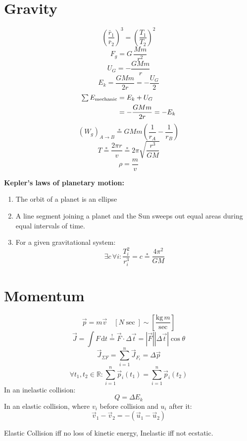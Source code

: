 \documentclass[]{article}
\newcommand\R     {\mathbb{R}}
\newcommand\seq   {\overset{!}{=}}
\newcommand\peq   {\overset{*}{=}}
\newcommand\dt    {\,\mathrm{d}t}
\newcommand\Dg        {\Delta}
\newcommand\co        {\colon}
\newcommand\sof[1]    {\left | #1 \right |}
\newcommand\cl [1]    {\left ( #1 \right )}
\newcommand\csb[1]    {\left [ #1 \right ]}
\begin{document}
\begin{multicols}{3}
		\section{Gravity}
		\[ \cl{\frac{\bar r_1}{\bar r_2}} ^3= \cl{\frac{T_1}{T_2}}^2 \]
		\[ F_g = G \, \frac{Mm}{r^2} \]
		\[ U_G = - \frac{G Mm}{r} \]
		\[ E_k = \frac{GMm}{2r} = - \frac{U_G}{2} \]
        \begin{align*}
            \textstyle \sum E_{\text{mechanic}} \displaystyle &= E_k + U_G \\
            &=  -\frac{GMm}{2r} = -E_k
        \end{align*}
        \[ (W_g)_{A \to B} \peq GMm\cl{\frac{1}{r_A} - \frac{1}{r_B}} \]
        \[ T \peq \frac{2\pi r}{v} \peq 2\pi\sqrt{\frac{r^3}{GM}} \]
		\[ \rho = \frac{m}{v} \]
        
        \columnbreak
        
        \textbf{Kepler's laws of planetary motion: }
        \begin{enumerate}
            \item The orbit of a planet is an ellipse
            \item A line segment joining a planet and the Sun sweeps out equal areas during equal intervals of time.
            \item For a given gravitational system: 
            \[ \exists c \, \forall i \co \frac{T_i^2}{r_i^3} = c \peq \frac{4\pi^2}{GM} \]
        \end{enumerate}
		
		\section{Momentum}
		\[ \vec p = m \vec v \quad \csb{N \sec} \sim \csb{\frac{\mathrm{kg}\,m}{\sec}}  \]
		\[ \vec J = \int F \dt \seq \vec F \cdot \Dg \vec t = \sof{\vec F} \sof{\Dg \vec t} \cos\theta \]
		\[ \vec J_{\Sigma F} = \sum_{i = 1}^{n}\vec J_{F_i} = \Dg \vec p \]
		\[ \forall t_1, t_2 \in \R \co \sum_{i = 1}^{n} \vec p_i(t_1) = \sum_{i = 1}^{n}\vec p_i(t_2) \]
		In an inelastic collision: 
		\[ Q = \Dg E_k \]
		In an elastic collision, where $v_i$ before collision and $u_i$ after it: 
		\[ \vec v_1 - \vec v_2 = -(\vec u_1 - \vec u_2) \]
        
        Elastic Collision iff no loss of kinetic energy, Inelastic iff not ecstatic.  
        

\end{multicols}
\end{document}
